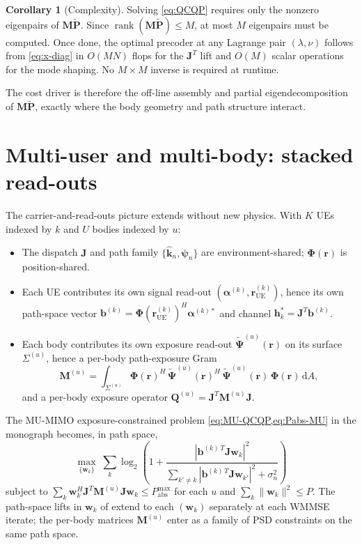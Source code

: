 \documentclass[11pt,a4paper]{article}
\theoremstyle{definition}
\newtheorem{corollary}[corollary]{Corollary}
\newcommand{\khat}{\hat{\bm{k}}}
\newcommand{\rr}{\mathbf{r}}
\newcommand{\diff}{\mathrm{d}}
\newcommand{\Jmat}{\mathbf{J}}                 %
\newcommand{\Phimat}{\mathbf{\Phi}}            %
\newcommand{\Psitil}{\tilde{\bm{\Psi}}}        %
\newcommand{\Mmat}{\mathbf{M}}                 %
\newcommand{\Qmat}{\mathbf{Q}}                 %
\newcommand{\Pmat}{\tilde{\mathbf{P}}}         %
\newcommand{\hh}{\mathbf{h}}
\newcommand{\bvec}{\mathbf{b}}
\newcommand{\alphavec}{\bm{\alpha}}
\newcommand{\psin}{\bm{\psi}_n}
\newcommand{\Sigmabody}{\Sigma}
\begin{document}
\begin{corollary}[Complexity]\label{cor:complexity}
Solving \eqref{eq:QCQP} requires only the nonzero eigenpairs of $\Mmat\Pmat$.
Since $\operatorname{rank}(\Mmat\Pmat)\le M$, at most $M$ eigenpairs must
be computed.  Once done, the optimal precoder at any Lagrange pair
$(\lambda,\nu)$ follows from \eqref{eq:x-diag} in $O(MN)$ flops for the
$\Jmat^T$ lift and $O(M)$ scalar operations for the mode shaping.  No
$M\times M$ inverse is required at runtime.
\end{corollary}

The cost driver is therefore the off-line assembly and partial
eigendecomposition of $\Mmat\Pmat$, exactly where the body geometry and
path structure interact.

\section{Multi-user and multi-body: stacked read-outs}\label{sec:MU}

The carrier-and-read-outs picture extends without new physics.  With $K$
UEs indexed by $k$ and $U$ bodies indexed by $u$:

\begin{itemize}[leftmargin=1.7em,itemsep=0.2em]
  \item The dispatch $\Jmat$ and path family $\{\khat_n,\psin\}$ are
  environment-shared; $\Phimat(\rr)$ is position-shared.
  \item Each UE contributes its own signal read-out
  $(\alphavec^{(k)},\rr_\mathrm{UE}^{(k)})$, hence its own path-space
  vector $\bvec^{(k)}=\Phimat(\rr_\mathrm{UE}^{(k)})^H\alphavec^{(k)*}$ and
  channel $\hh_k^*=\Jmat^T\bvec^{(k)}$.
  \item Each body contributes its own exposure read-out
  $\Psitil^{(u)}(\rr)$ on its surface $\Sigmabody^{(u)}$, hence a
  per-body path-exposure Gram
  \begin{equation}\label{eq:Mu-def}
    \Mmat^{(u)}=\int_{\Sigmabody^{(u)}}
    \Phimat(\rr)^H\,\Psitil^{(u)}(\rr)^H\,
    \Psitil^{(u)}(\rr)\,\Phimat(\rr)\,\diff A,
  \end{equation}
  and a per-body exposure operator
  $\Qmat^{(u)}=\Jmat^T\Mmat^{(u)}\Jmat$.
\end{itemize}

The MU-MIMO exposure-constrained problem \cref{eq:MU-QCQP,eq:Pabs-MU} in
the monograph becomes, in path space,
\begin{equation}\label{eq:mu-path}
  \max_{\{\mathbf w_k\}}\;\sum_k
  \log_2\!\left(1+\frac{|\bvec^{(k)\,T}\Jmat\mathbf w_k|^2}
  {\sum_{k'\neq k}|\bvec^{(k)\,T}\Jmat\mathbf w_{k'}|^2+\sigma_n^2}\right)
\end{equation}
subject to $\sum_k\mathbf w_k^H\Jmat^T\Mmat^{(u)}\Jmat\mathbf w_k\le
P_\mathrm{abs}^{\max}$ for each $u$ and
$\sum_k\|\mathbf w_k\|^2\le P$.  The path-space lifts in $\mathbf w_k$
of  extend to each $(\mathbf w_k)$ separately at each
WMMSE iterate; the per-body matrices $\Mmat^{(u)}$ enter as a family of
PSD constraints on the same path space.
\end{document}
